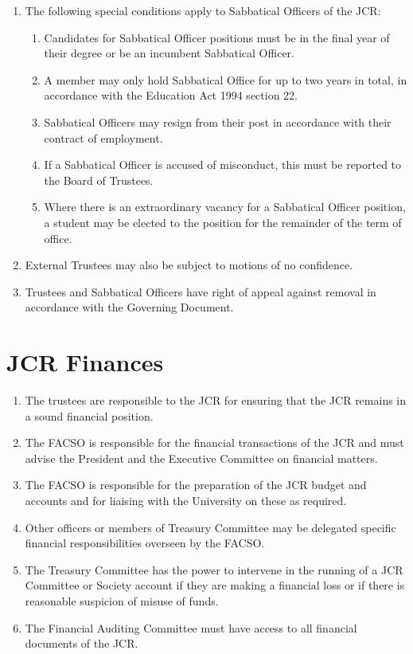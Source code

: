\documentclass[12pt]{article}
\begin{document}
\begin{enumerate}
    \item The following special conditions apply to Sabbatical Officers of the JCR:
    \begin{enumerate}
        \item Candidates for Sabbatical Officer positions must be in the final year of their degree or be an incumbent Sabbatical Officer.
        \item A member may only hold Sabbatical Office for up to two years in total, in accordance with the Education Act 1994 section 22.
        \item Sabbatical Officers may resign from their post in accordance with their contract of employment.
        \item If a Sabbatical Officer is accused of misconduct, this must be reported to the Board of Trustees.
        \item Where there is an extraordinary vacancy for a Sabbatical Officer position, a student may be elected to the position for the remainder of the term of office.
    \end{enumerate}
    \item External Trustees may also be subject to motions of no confidence.
    \item Trustees and Sabbatical Officers have right of appeal against removal in accordance with the Governing Document.
\end{enumerate}
\newpage

\section{JCR Finances}
\begin{enumerate}
    \item The trustees are responsible to the JCR for ensuring that the JCR remains in a sound financial position.
    \item The FACSO is responsible for the financial transactions of the JCR and must advise the President and the Executive Committee on financial matters.
    \item The FACSO is responsible for the preparation of the JCR budget and accounts and for liaising with the University on these as required.
    \item Other officers or members of Treasury Committee may be delegated specific financial responsibilities overseen by the FACSO.
    \item The Treasury Committee has the power to intervene in the running of a JCR Committee or Society account if they are making a financial loss or if there is reasonable suspicion of misuse of funds.
    \item The Financial Auditing Committee must have access to all financial documents of the JCR.
\end{enumerate}
\newpage
\end{document}
